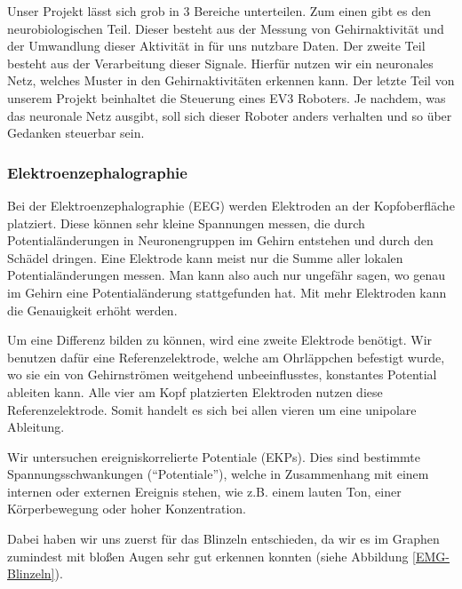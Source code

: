 \documentclass[11pt]{scrartcl}
\begin{document}
	Unser Projekt lässt sich grob in 3 Bereiche unterteilen. Zum einen gibt es den neurobiologischen Teil. Dieser besteht aus der Messung von Gehirnaktivität und der Umwandlung dieser Aktivität in für uns nutzbare Daten. Der zweite Teil besteht aus der Verarbeitung dieser Signale. Hierfür nutzen wir ein neuronales Netz, welches Muster in den Gehirnaktivitäten erkennen kann. Der letzte Teil von unserem Projekt beinhaltet die Steuerung eines EV3 Roboters. Je nachdem, was das neuronale Netz ausgibt, soll sich dieser Roboter anders verhalten und so über Gedanken steuerbar sein.	

	\subsubsection{Elektroenzephalographie}

	Bei der Elektroenzephalographie (EEG) werden Elektroden an der Kopfoberfläche platziert. Diese können sehr kleine Spannungen messen, die durch Potentialänderungen in Neuronengruppen im Gehirn entstehen und durch den Schädel dringen. Eine Elektrode kann meist nur die Summe aller lokalen Potentialänderungen messen. Man kann also auch nur ungefähr sagen, wo genau im Gehirn eine Potentialänderung stattgefunden hat. Mit mehr Elektroden kann die Genauigkeit erhöht werden. \cite{wiki:EEG} \cite{Birbaumer2010}

	Um eine Differenz bilden zu können, wird eine zweite Elektrode benötigt. Wir benutzen dafür eine Referenzelektrode, welche am Ohrläppchen befestigt wurde, wo sie ein von Gehirnströmen weitgehend unbeeinflusstes, konstantes Potential ableiten kann. Alle vier am Kopf platzierten Elektroden nutzen diese Referenzelektrode. Somit handelt es sich bei allen vieren um eine unipolare Ableitung. \cite{Praktikum}

	Wir untersuchen ereigniskorrelierte Potentiale (EKPs). Dies sind bestimmte Spannungsschwankungen (\enquote{Potentiale}), welche in Zusammenhang mit einem internen oder externen Ereignis stehen, wie z.B. einem lauten Ton, einer Körperbewegung oder hoher Konzentration. \cite{Birbaumer2010} \cite{Praktikum}

	Dabei haben wir uns zuerst für das Blinzeln entschieden, da wir es im Graphen zumindest mit bloßen Augen sehr gut erkennen konnten (siehe Abbildung \ref{EMG-Blinzeln}).
\end{document}
